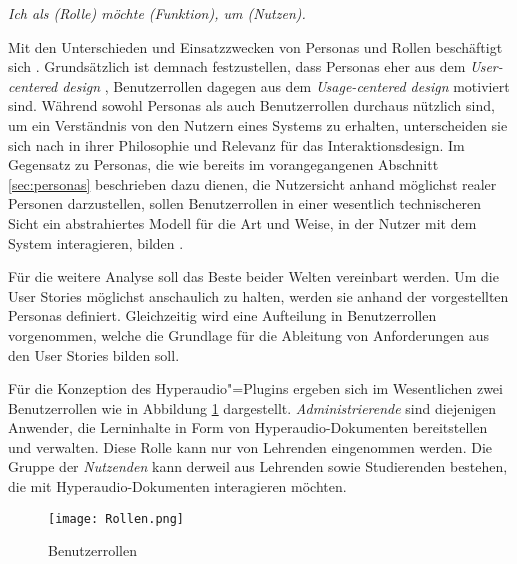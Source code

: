 \par
\begingroup
\leftskip=1cm
\rightskip=1.5cm
\noindent

\textit{Ich als (Rolle) möchte (Funktion), um (Nutzen).}

\par
\endgroup

\vspace{.3cm}

Mit den Unterschieden und Einsatzzwecken von Personas und Rollen beschäftigt sich \cite{constantine2006users}. Grundsätzlich ist demnach festzustellen, dass Personas eher aus dem \textit{User-centered design} \citep{Norman1986user}, Benutzerrollen dagegen aus dem \textit{Usage-centered design} \citep{Constantine1996usage} motiviert sind. Während sowohl Personas als auch Benutzerrollen durchaus nützlich sind, um ein Verständnis von den Nutzern eines Systems zu erhalten, unterscheiden sie sich nach \cite{constantine2006users} in ihrer Philosophie und Relevanz für das Interaktionsdesign. Im Gegensatz zu Personas, die wie bereits im vorangegangenen Abschnitt \ref{sec:personas} beschrieben dazu dienen, die Nutzersicht anhand möglichst realer Personen darzustellen, sollen Benutzerrollen in einer wesentlich technischeren Sicht ein abstrahiertes Modell für die Art und Weise, in der Nutzer mit dem System interagieren, bilden \citep{constantine2006users}.

Für die weitere Analyse soll das Beste beider Welten vereinbart werden. Um die User Stories möglichst anschaulich zu halten, werden sie anhand der vorgestellten Personas definiert. Gleichzeitig wird eine Aufteilung in Benutzerrollen vorgenommen, welche die Grundlage für die Ableitung von Anforderungen aus den User Stories bilden soll.

Für die Konzeption des Hyperaudio"=Plugins ergeben sich im Wesentlichen zwei Benutzerrollen wie in Abbildung \ref{fig:Rollen} dargestellt. \textit{Administrierende} sind diejenigen Anwender, die Lerninhalte in Form von Hyperaudio-Dokumenten bereitstellen und verwalten. Diese Rolle kann nur von Lehrenden eingenommen werden. Die Gruppe der \textit{Nutzenden} kann derweil aus Lehrenden sowie Studierenden bestehen, die mit Hyperaudio-Dokumenten interagieren möchten.

\begin{figure}[h!]
\texttt{[image: Rollen.png]}
\caption{\label{fig:Rollen}Benutzerrollen}
\end{figure}

\FloatBarrier

